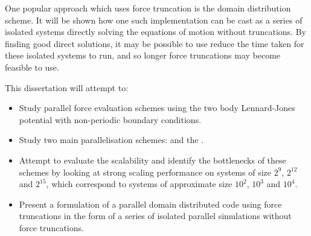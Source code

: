%
One popular approach which uses force truncation is the
domain distribution scheme.
It will be shown how one such implementation can be cast as
a series of isolated systems
directly solving the equations of motion without truncations.
%
By finding good direct solutions, it may be possible to use reduce the
time taken for these isolated systems to run, and so longer
force truncations may become feasible to use.


%
This dissertation will attempt to:
\begin{itemize}
\item
    Study parallel force evaluation schemes using
    the two body Lennard-Jones potential with
    non-periodic boundary conditions.

\item
    Study two main parallelisation schemes:
    \replicateddata{} and the \systolicloop{}.

\item
    Attempt to evaluate the scalability and
    identify the bottlenecks of these schemes
    by looking at strong scaling performance
    on systems of size
    $2^{9}$, $2^{12}$ and $2^{15}$, which correspond
    to systems of approximate size $10^2$, $10^3$ and $10^4$.

\item
    Present a formulation of a parallel domain distributed code using
    force truncations in the form of
    a series of isolated parallel simulations
    without force truncations.
\end  {itemize}
